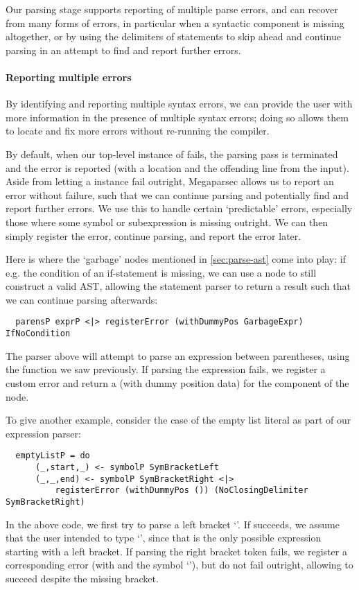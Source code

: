 Our parsing stage supports reporting of multiple parse errors, and can recover
from many forms of errors, in particular when a syntactic component is missing
altogether, or by using the delimiters of statements to skip ahead and continue
parsing in an attempt to find and report further errors.


\paragraph{Reporting multiple errors}

By identifying and reporting multiple syntax errors, we can provide the user
with more information in the presence of multiple syntax errors; doing so allows
them to locate and fix more errors without re-running the compiler.

By default, when our top-level instance of  fails, the
parsing pass is terminated and the error is reported (with a location and the
offending line from the input).
Aside from letting a  instance fail outright, Megaparsec
allows us to report an error without failure, such that we can continue parsing
and potentially find and report further errors.
We use this to handle certain `predictable' errors, especially those where some
symbol or subexpression is missing outright. We can then simply register the
error, continue parsing, and report the error later.

Here is where the `garbage' nodes mentioned in \cref{sec:parse-ast} come
into play: if e.g. the condition of an if-statement is missing, we can use a
 node to still construct a valid AST, allowing the
statement parser to return a result such that we can continue parsing
afterwards:
\begin{verbatim}
  parensP exprP <|> registerError (withDummyPos GarbageExpr) IfNoCondition
\end{verbatim}
%
The parser above will attempt to parse an expression between parentheses, using
the  function we saw previously.
If parsing the expression fails, we register a custom 
error and return a  (with dummy position data) for the
 component of the  node.


To give another example, consider the case of the empty list literal
\spl{[]} as part of our expression parser:
\begin{verbatim}
  emptyListP = do
      (_,start,_) <- symbolP SymBracketLeft
      (_,_,end) <- symbolP SymBracketRight <|>
          registerError (withDummyPos ()) (NoClosingDelimiter SymBracketRight)
\end{verbatim}
%
In the above code, we first try to parse a left bracket `\code{[}'. If
  succeeds, we assume that the user intended to
type `\code{[]}', since that is the only possible expression starting with a
left bracket.
If parsing the right bracket token fails, we register a corresponding
error (with  and the symbol `\code{]}'),
but do not fail outright, allowing  to succeed despite the
missing bracket.


